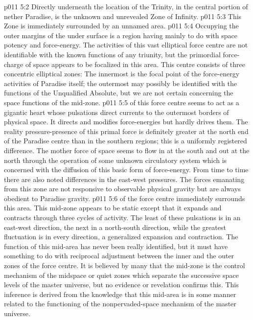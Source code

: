 \vs p011 5:2 \bibnobreakspace Directly underneath the location of the Trinity, in the central portion of nether Paradise, is the unknown and unrevealed Zone of Infinity.
\vs p011 5:3 \bibnobreakspace This Zone is immediately surrounded by an unnamed area.
\vs p011 5:4 \bibnobreakspace Occupying the outer margins of the under surface is a region having mainly to do with space potency and force\hyp{}energy. The activities of this vast elliptical force centre are not identifiable with the known functions of any triunity, but the primordial force\hyp{}charge of space appears to be focalized in this area. This centre consists of three concentric elliptical zones: The innermost is the focal point of the force\hyp{}energy activities of Paradise itself; the outermost may possibly be identified with the functions of the Unqualified Absolute, but we are not certain concerning the space functions of the mid\hyp{}zone.
\vs p011 5:5 \pc {} of this force centre seems to act as a gigantic heart whose pulsations direct currents to the outermost borders of physical space. It directs and modifies force\hyp{}energies but hardly drives them. The reality pressure\hyp{}presence of this primal force is definitely greater at the north end of the Paradise centre than in the southern regions; this is a uniformly registered difference. The mother force of space seems to flow in at the south and out at the north through the operation of some unknown circulatory system which is concerned with the diffusion of this basic form of force\hyp{}energy. From time to time there are also noted differences in the east\hyp{}west pressures. The forces emanating from this zone are not responsive to observable physical gravity but are always obedient to Paradise gravity.
\vs p011 5:6 \pc {} of the force centre immediately surrounds this area. This mid\hyp{}zone appears to be static except that it expands and contracts through three cycles of activity. The least of these pulsations is in an east\hyp{}west direction, the next in a north\hyp{}south direction, while the greatest fluctuation is in every direction, a generalized expansion and contraction. The function of this mid\hyp{}area has never been really identified, but it must have something to do with reciprocal adjustment between the inner and the outer zones of the force centre. It is believed by many that the mid\hyp{}zone is the control mechanism of the midspace or quiet zones which separate the successive space levels of the master universe, but no evidence or revelation confirms this. This inference is derived from the knowledge that this mid\hyp{}area is in some manner related to the functioning of the nonpervaded\hyp{}space mechanism of the master universe.
